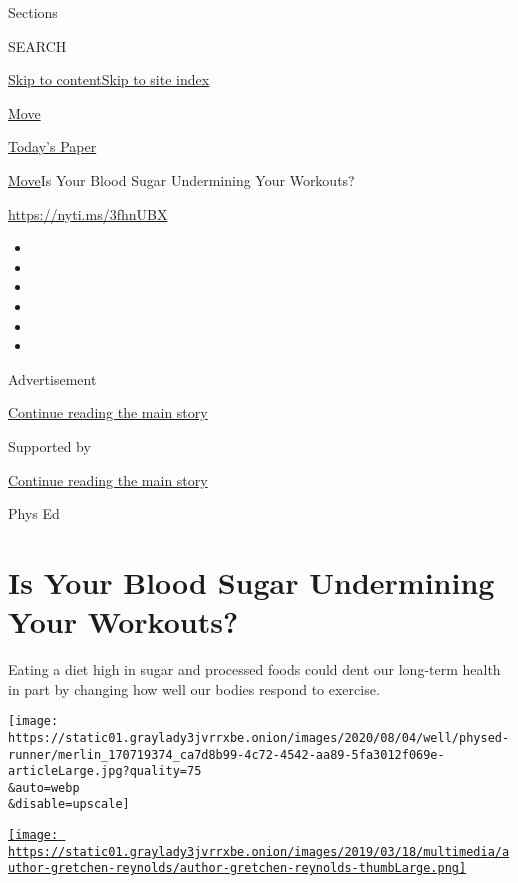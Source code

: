 Sections

SEARCH

\protect\hyperlink{site-content}{Skip to
content}\protect\hyperlink{site-index}{Skip to site index}

\href{https://www.nytimes3xbfgragh.onion/section/well/move}{Move}

\href{https://myaccount.nytimes3xbfgragh.onion/auth/login?response_type=cookie\&client_id=vi}{}

\href{https://www.nytimes3xbfgragh.onion/section/todayspaper}{Today's
Paper}

\href{/section/well/move}{Move}\textbar{}Is Your Blood Sugar Undermining
Your Workouts?

\url{https://nyti.ms/3fhnUBX}

\begin{itemize}
\item
\item
\item
\item
\item
\item
\end{itemize}

Advertisement

\protect\hyperlink{after-top}{Continue reading the main story}

Supported by

\protect\hyperlink{after-sponsor}{Continue reading the main story}

Phys Ed

\hypertarget{is-your-blood-sugar-undermining-your-workouts}{%
\section{Is Your Blood Sugar Undermining Your
Workouts?}\label{is-your-blood-sugar-undermining-your-workouts}}

Eating a diet high in sugar and processed foods could dent our long-term
health in part by changing how well our bodies respond to exercise.

\texttt{[image: https://static01.graylady3jvrrxbe.onion/images/2020/08/04/well/physed-runner/merlin\_170719374\_ca7d8b99-4c72-4542-aa89-5fa3012f069e-articleLarge.jpg?quality=75\\\&auto=webp\\\&disable=upscale]}

\href{https://www.nytimes3xbfgragh.onion/by/gretchen-reynolds}{\texttt{[image: https://static01.graylady3jvrrxbe.onion/images/2019/03/18/multimedia/author-gretchen-reynolds/author-gretchen-reynolds-thumbLarge.png]}}

